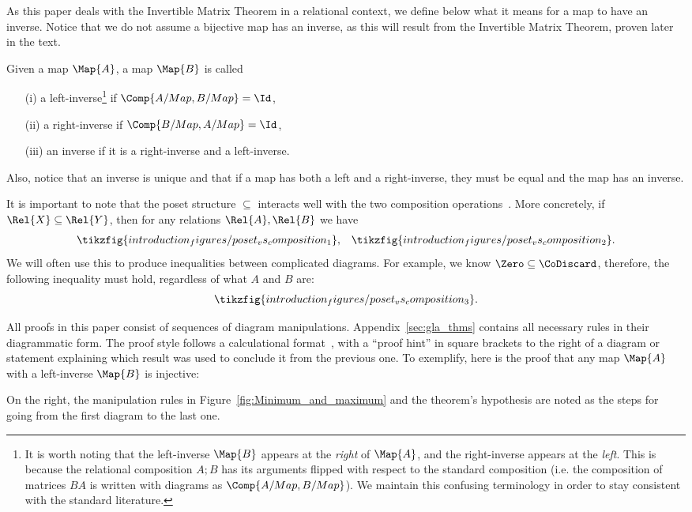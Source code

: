 \documentclass[manyauthors]{fundam}
\begin{document}
As this paper deals with the Invertible Matrix Theorem in a relational context,
we define below what it means for a map to have an inverse.
Notice that we do not assume a bijective map has an inverse,
as this will result from the Invertible Matrix Theorem, proven later in the text.
\begin{definition}
\label{def:inverse}
  Given a map $\Map{A}$, a map $\Map{B}$ is called
  \begin{enumerate}
      \item[(i)] a left-inverse\footnote{It is worth noting that the left-inverse $\Map{B}$ appears at the \emph{right} of $\Map{A}$, and the right-inverse appears at the \emph{left}. This is because the relational composition $A ; B$ has its arguments flipped with respect to the standard composition (i.e. the composition of matrices $BA$ is written with diagrams as $\Comp{A/Map, B/Map}$). We maintain this confusing terminology in order to stay consistent with the standard literature.} if $\Comp{A/Map, B/Map} = \Id$,
      \item[(ii)] a right-inverse if $\Comp{B/Map, A/Map} = \Id$,
      \item[(iii)] an inverse if it is a right-inverse and a left-inverse.
  \end{enumerate}
\end{definition}
\noindent Also, notice that an inverse is unique
and that if a map has both a left and a right-inverse, they must be equal
and the map has an inverse.

It is important to note that the poset structure $\subseteq$
interacts well with the two composition operations~\cite{PAIXAO2022}.
More concretely, if $\Rel{X} \subseteq \Rel{Y}$, then for any relations $\Rel{A}, \Rel{B}$ we have
\begin{align*}
  \tikzfig{introduction_figures/poset_vs_composition_1}
  &,&
  \tikzfig{introduction_figures/poset_vs_composition_2}.
\end{align*}
We will often use this to produce inequalities between complicated diagrams. For example, we know $\Zero \subseteq \CoDiscard$, therefore, the following inequality must hold, regardless of what $A$ and $B$ are:
\[\tikzfig{introduction_figures/poset_vs_composition_3}.\]

All proofs in this paper consist of sequences of diagram manipulations.
Appendix~\ref{sec:gla_thms} contains all necessary rules in their diagrammatic form.
The proof style follows a calculational format~\cite{Dijkstra1989PredicateCA},
with a ``proof hint'' in square brackets to the right of a diagram or statement
explaining which result was used  to conclude it from the previous one.
To exemplify, here is the proof that any map $\Map{A}$ with a left-inverse $\Map{B}$
is injective:
\begin{hcalculation}[\subseteq]{}
\end{hcalculation}
On the right, the manipulation rules in Figure~\ref{fig:Minimum_and_maximum}
and the theorem's hypothesis
are noted as the steps for going from the first diagram to the last one.
\end{document}
